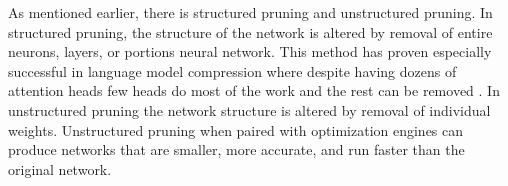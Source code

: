 \documentclass[sigplan,screen]{acmart}
\begin{document}
As mentioned earlier, there is structured pruning and unstructured pruning. In structured pruning, the structure of the network is altered by removal of entire neurons, layers, or portions neural network. This method has proven especially successful in language model compression where despite having dozens of attention heads \cite{Vaswani2017AttentionIA} few heads do most of the work and the rest can be removed \cite{Michel2019AreSH}. In unstructured pruning the network structure is altered by removal of individual weights. Unstructured pruning when paired with optimization engines can produce networks that are smaller, more accurate, and run faster than the original network. \\


\end{document}
